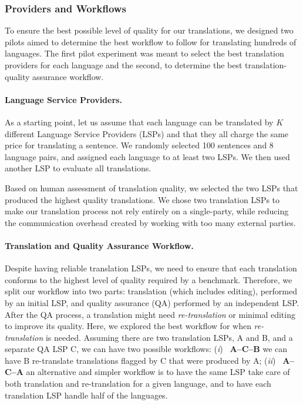 \subsubsection{Providers and Workflows} To ensure the best possible level of quality for our translations, we designed two pilots aimed to determine the best workflow to follow for translating hundreds of languages. The first pilot experiment was meant to select the best translation providers for each language and the second, to determine the best translation-quality assurance workflow. 

\paragraph{Language Service Providers.} 

As a starting point, let us assume that each language can be translated by $K$ different Language Service Providers (LSPs) and that they all charge the same price for translating a sentence. We randomly selected 100 sentences and 8 language pairs, and assigned each language to at least two LSPs. We then used another LSP to evaluate all translations.

Based on human assessment of translation quality, we selected the two LSPs that produced the highest quality translations. We chose two translation LSPs to make our translation process not rely entirely on a single-party, while reducing the communication overhead created by working with too many external parties.

\paragraph{Translation and Quality Assurance Workflow.} 

Despite having reliable translation LSPs, we need to ensure that each translation conforms to the highest level of quality required by a benchmark. Therefore, we split our workflow into two parts: translation (which includes editing), performed by an initial LSP, and quality assurance (QA) performed by an independent LSP. After the QA process, a translation might need \textit{re-translation} or minimal editing to improve its quality. Here, we explored the best workflow for when  \textit{re-translation} is needed. Assuming there are two translation LSPs, A and B, and a separate QA LSP C, we can have two possible workflows:
({\em i})~ \textbf{A--C--B} we can have B re-translate translations flagged by C that were produced by A;
({\em ii})~ \textbf{A--C--A} an alternative and simpler workflow is to have the same LSP take care of both translation and re-translation for a given language, and to have each translation LSP handle half of the languages.

